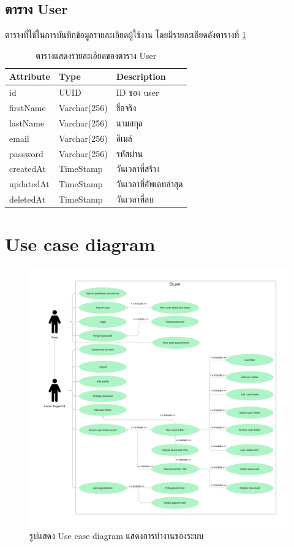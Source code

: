 \documentclass[12pt,oneside,openright,a4paper]{cpe-thai-project}
\begin{document}
\subsection{ตาราง User}
ตารางที่ใช้ในการบันทึกข้อมูลรายละเอียดผู้ใช้งาน โดยมีรายละเอียดดังตารางที่ \ref{tbl:dbUser}
\begin{table}[!ht]
    \centering
    \begin{tabular}{|p{4cm}|p{2cm}|p{6cm}|}
    \hline
    \textbf{Attribute} & \textbf{Type} & \textbf{Description}   \\ \hline
    id        & UUID        & ID ของ user            \\ \hline
    firstName & Varchar(256) & ชื่อจริง               \\ \hline
    lastName  & Varchar(256) & นามสกุล                \\ \hline
    email     & Varchar(256) & อีเมล์                 \\ \hline
    password  & Varchar(256) & รหัสผ่าน               \\ \hline
    createdAt & TimeStamp   & วันเวลาที่สร้าง        \\ \hline
    updatedAt & TimeStamp   & วันเวลาที่อัพเดทล่าสุด \\ \hline
    deletedAt & TimeStamp   & วันเวลาที่ลบ                \\ \hline
    \end{tabular}
    \caption{\centering  ตารางแสดงรายละเอียดของตาราง User} \label{tbl:dbUser}
\end{table}
\newpage
\section{Use case diagram}
\begin{figure}[!ht]\centering
    \includegraphics[width=16cm]{./assets/use-case-diagram.png}
    \caption{รูปแสดง Use case diagram แสดงการทำงานของระบบ}\label{fig:usecaseDiagram}
\end{figure}
\end{document}
